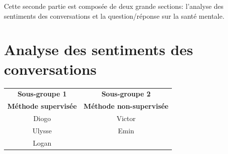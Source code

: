 \documentclass[12pt,a4paper]{article}
\begin{document}
\pagebreak
Cette seconde partie est composée de deux grande sections: l'analyse des sentiments des conversations et la question/réponse sur la santé mentale.
\section{Analyse des sentiments des conversations}

\begin{center}
\begin{tabular}{c|c}
\toprule
\textbf{Sous-groupe 1} & \textbf{Sous-groupe 2} \\
\textbf{Méthode supervisée} & \textbf{Méthode non-supervisée} \\
\midrule
Diogo & Victor\\
Ulysse & Emin\\
Logan &  \\
\bottomrule
\end{tabular}
\end{center}

\bigbreak
\end{document}
